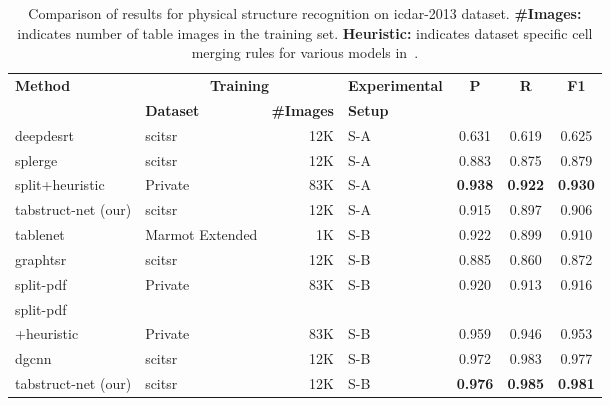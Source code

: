\documentclass[runningheads]{llncs}
\begin{document}
\begin{table}[ht!]
\begin{center}
\begin{tabular}{|l | l| r| l |c c c|} \hline
\textbf{Method} &\multicolumn{2}{|c|}{\textbf{Training}} &\textbf{Experimental} &\textbf{P} &\textbf{R} &\textbf{F1} \\ \cline{2-3}
  &\textbf{Dataset} &\textbf{\#Images} &\textbf{Setup} & & & \\ \hline
{\sc d}eep{\sc d}e{\sc srt}~\cite{schreiber2017deepdesrt} &{\sc s}ci{\sc tsr} &12K &S-A &0.631 &0.619 &0.625 \\
{\sc splerge}~\cite{table_splitting} &{\sc s}ci{\sc tsr} &12K &S-A &0.883 &0.875 &0.879 \\
{\sc s}plit+{\sc h}euristic~\cite{table_splitting} &Private~\cite{table_splitting} &83K &S-A &\textbf{0.938} &\textbf{0.922} &\textbf{0.930} \\
{\sc t}ab{\sc s}truct-{\sc n}et (our) &{\sc s}ci{\sc tsr} &12K &S-A &0.915 &0.897 &0.906 \\ \hline
{\sc t}able{\sc n}et~\cite{paliwal2019tablenet} &Marmot Extended &1K &S-B &0.922 &0.899 &0.910 \\ 
{\sc g}raph{\sc tsr}~\cite{chi2019complicated} &{\sc s}ci{\sc tsr} &12K &S-B &0.885 &0.860 &0.872 \\ 
{\sc s}plit-{\sc pdf}~\cite{table_splitting} &Private~\cite{table_splitting} &83K &S-B &0.920 &0.913 &0.916 \\ 
{\sc s}plit-{\sc pdf} & & & & & & \\
+{\sc h}euristic~\cite{table_splitting} &Private~\cite{table_splitting} &83K &S-B &0.959 &0.946 &0.953 \\ 
{\sc dgcnn}~\cite{qasim2019rethinking} &{\sc s}ci{\sc tsr} &12K &S-B &0.972 &0.983 &0.977 \\
{\sc t}ab{\sc s}truct-{\sc n}et (our) &{\sc s}ci{\sc tsr} &12K &S-B &\textbf{0.976} &\textbf{0.985} &\textbf{0.981} \\ \hline 
\end{tabular}
\end{center}
\caption{Comparison of results for physical structure recognition on {\sc icdar}-2013 dataset. \textbf{\#Images:} indicates number of table images in the training set. \textbf{Heuristic:} indicates dataset specific cell merging rules for various models in~\cite{table_splitting}.\label{table_physical_icdar_2013}}
\vspace{-1em}
\end{table}
\end{document}
